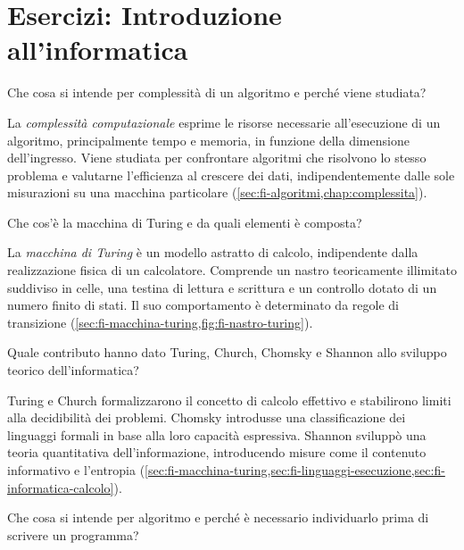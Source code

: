 \chapter{Esercizi: Introduzione all'informatica}
\label{chap:esercizi-introduzione-informatica}

\begin{exercise}
\label{ex:fi-intro-complessita}
Che cosa si intende per complessità di un algoritmo e perché viene
studiata?
\end{exercise}

La \emph{complessità computazionale} esprime le risorse necessarie
all'esecuzione di un algoritmo, principalmente tempo e memoria, in
funzione della dimensione dell'ingresso. Viene studiata per confrontare
algoritmi che risolvono lo stesso problema e valutarne l'efficienza
al crescere dei dati, indipendentemente dalle sole misurazioni su una
macchina particolare (\cref{sec:fi-algoritmi,chap:complessita}).

\begin{exercise}
\label{ex:fi-intro-turing-definizione}
Che cos'è la macchina di Turing e da quali elementi è composta?
\end{exercise}

La \emph{macchina di Turing} è un modello astratto di calcolo, indipendente
dalla realizzazione fisica di un calcolatore. Comprende un nastro
teoricamente illimitato suddiviso in celle, una testina di lettura e
scrittura e un controllo dotato di un numero finito di stati. Il suo
comportamento è determinato da regole di transizione
(\cref{sec:fi-macchina-turing,fig:fi-nastro-turing}).

\begin{exercise}
\label{ex:fi-intro-contributi-teorici}
Quale contributo hanno dato Turing, Church, Chomsky e Shannon allo
sviluppo teorico dell'informatica?
\end{exercise}

Turing e Church formalizzarono il concetto di calcolo effettivo e
stabilirono limiti alla decidibilità dei problemi. Chomsky introdusse
una classificazione dei linguaggi formali in base alla loro capacità
espressiva. Shannon sviluppò una teoria quantitativa dell'informazione,
introducendo misure come il contenuto informativo e l'entropia
(\cref{sec:fi-macchina-turing,sec:fi-linguaggi-esecuzione,sec:fi-informatica-calcolo}).

\begin{exercise}
\label{ex:fi-intro-algoritmo-programma}
Che cosa si intende per algoritmo e perché è necessario individuarlo prima
di scrivere un programma?
\end{exercise}

